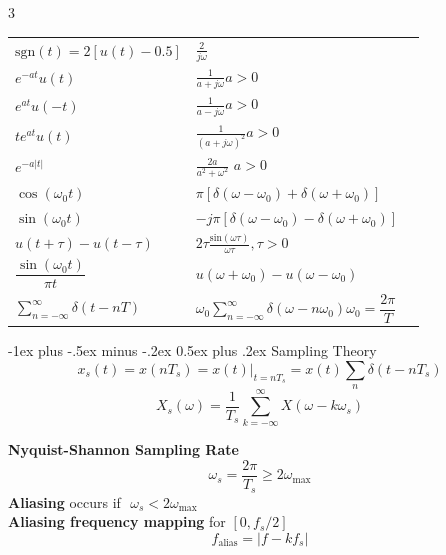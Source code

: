 \documentclass[10pt,landscape]{article}
\makeatletter
\renewcommand{\section}{\@startsection{section}{1}{0mm}%
        {-1ex plus -.5ex minus -.2ex}%
            {0.5ex plus .2ex}%
                {\normalfont\large\bfseries}}
\makeatother
\begin{document}
\begin{multicols}{3}
{\begin{tabularx}{\columnwidth}{l X X}
    $\text{sgn}(t)=2[u(t)-0.5]$ &
    $\displaystyle \frac{2}{j\omega}$\\[10pt]
    
    $e^{-at}u(t)$ &
    $\displaystyle\frac{1}{a+j\omega}$\hfill $a >0$ \\[10pt]
    
    $e^{at}u(-t)$ &
    $\displaystyle\frac{1}{a-j\omega}$\hfill $a >0$ \\[10pt]
    
    $te^{at}u(t)$ &
    $\displaystyle\frac{1}{(a+j\omega)^2}$\hfill $a >0$ \\[10pt]
    
    $e^{-a|t|}$ &
    $\displaystyle \frac{2a}{a^2+\omega^2}$ \hfill $a>0$  \\[10pt]
    
    $\cos(\omega_0t)$ &
    $\displaystyle \pi[\delta(\omega-\omega_0)+\delta(\omega+\omega_0)]$ \\[10pt]
    
    $\sin(\omega_0t)$ & $\displaystyle -j\pi[\delta(\omega-\omega_0)-\delta(\omega+\omega_0)]$ \\[10pt]
    
    $u(t+\tau)-u(t-\tau)$
     &$\displaystyle 2\tau\frac{\text{sin}(\omega\tau)}{\omega\tau},$\hfill $\tau > 0$ \\[10pt]
    
    $\dfrac{\sin(\omega_0t)}{\pi t}$
     &$\displaystyle u(\omega+\omega_0)-u(\omega-\omega_0)$ \\[10pt]
    
    
    $\displaystyle\sum_{n=-\infty}^\infty\delta(t-nT)$
     &$\displaystyle\omega_0\sum_{n=-\infty}^\infty\delta(\omega-n\omega_0)$\hfill $\omega_0=\dfrac{2\pi}{T}$\\
    \end{tabularx}}


    
    \section{Sampling Theory}
     \[x_s(t) = x(nT_s) = x(t)\rvert_{t = nT_s} = x(t)\sum_n \delta(t - nT_s)\]
    \[X_s(\omega) = \frac{1}{T_s} \sum_{k=-\infty}^{\infty}X(\omega - k\omega_s)\]
    
    \textbf{Nyquist-Shannon Sampling Rate}
     \[\omega_s = \frac{2\pi}{T_s} \geq 2\omega_\text{max}\]
    \textbf{Aliasing} occurs if\,\, $\omega_s < 2\omega_\text{max}$\\[4pt]
    \textbf{Aliasing frequency mapping} for $[0, f_s/2]$
    \[f_{\text{alias}}=|f-kf_{s}|\]


\end{multicols}
\end{document}
